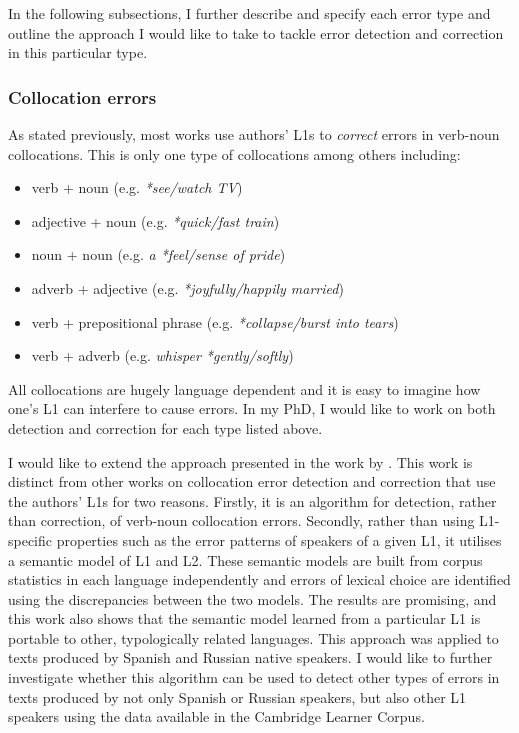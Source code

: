 \documentclass[11pt]{article}
\begin{document}
In the following subsections, I further describe and specify each error type and outline the approach I would like to take to tackle error detection and correction in this particular type.


\subsubsection{Collocation errors}
\label{subsub:collocation}
As stated previously, most works use authors' L1s to \emph{correct} errors in 
verb-noun collocations. This is only one type of collocations among others including:
\begin{itemize}
\item verb + noun (e.g. \emph{*see/watch TV})
\item adjective + noun (e.g. \emph{*quick/fast train})
\item noun + noun (e.g. \emph{a *feel/sense of pride})
\item adverb + adjective (e.g. \emph{*joyfully/happily married})
\item verb + prepositional phrase (e.g. \emph{*collapse/burst into tears})
\item verb + adverb (e.g. \emph{whisper *gently/softly})
\end{itemize}
All collocations are hugely language dependent and it is easy to imagine how 
one's L1 can interfere to cause errors. In my PhD, I would like to work on both 
detection and correction for each type listed above.

I would like to extend the approach presented in the work by 
\cite{kochmarcross}. This work is distinct from other works on collocation 
error detection and correction that use the authors' L1s for two reasons. 
Firstly, it is an algorithm for detection, rather than correction, of verb-noun collocation errors. Secondly, rather than using L1-specific properties 
such as the error patterns of speakers of a given L1, it utilises a semantic 
model of L1 and L2. These semantic models are built from corpus statistics in 
each language independently and errors of lexical choice are identified using the 
discrepancies between the two models. The results are promising, and this work also 
shows that the semantic model learned from a particular L1 is portable to other, 
typologically related languages. This approach was applied to texts produced by 
Spanish and Russian native speakers. I would like to further investigate whether 
this algorithm can be used to detect other types of errors in texts produced by 
not only Spanish or Russian speakers, but also other L1 speakers using the data available in the Cambridge Learner Corpus.
					
\end{document}
